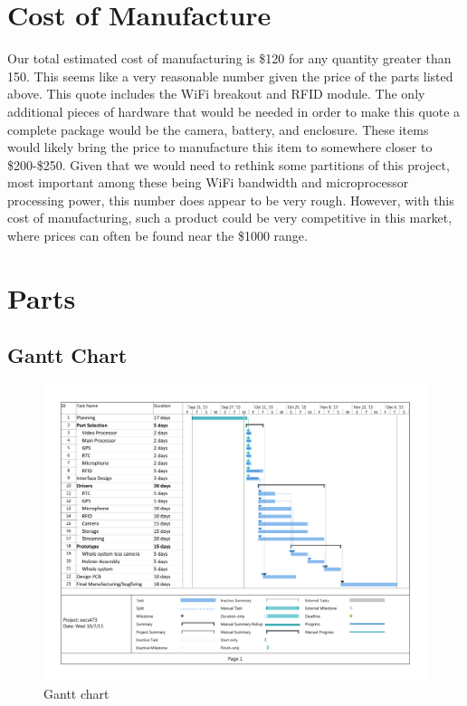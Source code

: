 \documentclass[12pt]{article}
\begin{document}
\section{Cost of Manufacture}
Our total estimated cost of manufacturing is \$120 for any quantity greater
than 150. This seems like a very reasonable number given the price of the parts
listed above. This quote includes the WiFi breakout and RFID module. The only
additional pieces of hardware that would be needed in order to make this quote
a complete package would be the camera, battery, and enclosure. These items
would likely bring the price to manufacture this item to somewhere closer to
\$200-\$250. Given that we would need to rethink some partitions of this project,
most important among these being WiFi bandwidth and microprocessor processing
power, this number does appear to be very rough. However, with this cost of
manufacturing, such a product could be very competitive in this market, where
prices can often be found near the \$1000 range.

\section{Parts}

\newpage




\newpage

\appendix

\begin{landscape}
    \section{Gantt Chart}
    \label{app:gantt}
    \thispagestyle{empty}

    \begin{figure}[h!]
        \centering
        \includegraphics[width=1.1\textwidth]{gantt}
        \caption{Gantt chart}
        \label{fig:gantt}
    \end{figure}
\end{landscape}
\end{document}

